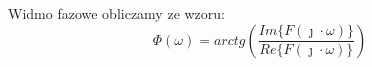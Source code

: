 \begin{task}
\begin{figure}[H]
\begin{tikzpicture}
	\end{tikzpicture}
\end{figure}

Widmo fazowe obliczamy ze wzoru:
\begin{equation}
\Phi ( \omega )=arctg(\frac{Im\{F(\jmath \cdot \omega )\}}{Re\{F(\jmath \cdot \omega )\}})
\end{equation}

%	
%	  
%	

\end{task}

